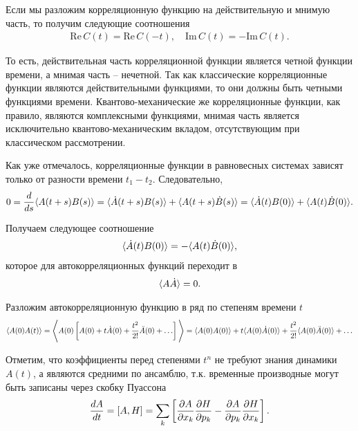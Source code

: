 Если мы разложим корреляционную функцию на действительную и мнимую часть, то получим следующие соотношения 
\begin{gather}
    \text{Re} \, C(t) = \text{Re} \, C(-t), \quad \text{Im} \, C(t) = -\text{Im} \, C(t).
\end{gather}

То есть, действительная часть корреляционной функции является четной функции времени, а мнимая часть -- нечетной. Так как классические корреляционные функции являются действительными функциями, то они должны быть четными функциями времени. Квантово-механические же корреляционные функции, как правило, являются комплексными функциями, мнимая часть является исключительно квантово-механическим вкладом, отсутствующим при классическом рассмотрении.


Как уже отмечалось, корреляционные функции в равновесных системах зависят только от разности времени $t_1 - t_2$. Следовательно,
\begin{gather}
    0 = \frac{d}{ds} \langle  A(t+s) B(s)  \rangle = \langle  \dot{A}(t+s) B(s)  \rangle + \langle  A(t+s) \dot{B}(s)  \rangle = \langle  \dot{A}(t) B(0)  \rangle + \langle  A(t) \dot{B}(0)  \rangle.
\end{gather}

Получаем следующее соотношение 
\begin{gather}
    \langle \dot{A}(t)B(0) \rangle = -\langle A(t)\dot{B}(0) \rangle, 
\end{gather}
которое для автокорреляционных функций переходит в 
\begin{gather}
    \langle A \dot{A} \rangle = 0. \label{litreview-temp1}
\end{gather}

Разложим автокорреляционную функцию в ряд по степеням времени $t$
\begin{gather}
    \mean{A(0) A(t)} = \Bigg\langle A(0) \lsq A(0) + t \dot{A}(0) + \frac{t^2}{2!} \ddot{A}(0) + \dots \rsq \Bigg\rangle = \mean{A(0) A(0)} + t \mean{A(0) \dot{A}(0)} + \frac{t^2}{2!} \mean{A(0) \ddot{A}(0)} + \dots \label{litreview-correlation-function-series}
\end{gather}

Отметим, что коэффициенты перед степенями $t^n$ не требуют знания динамики $A(t)$, а являются средними по ансамблю, т.к. временные производные могут быть записаны через скобку Пуассона
\begin{gather}
    \frac{dA}{dt} = \left[ A, H \right] = \sum_k \left[ \frac{\partial A}{\partial x_k} \frac{\partial H}{\partial p_k} - \frac{\partial A}{\partial p_k} \frac{\partial H}{\partial x_k} \right]. \label{litreview-poisson-bracket}
\end{gather}

